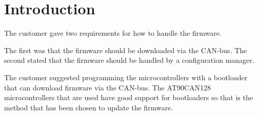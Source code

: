 \section{Introduction}\label{sec:introduction}
The customer gave two requirements for how to handle the firmware.

The first was that the firmware should be downloaded via the CAN-bus. The second stated that the firmware should be handled by a configuration manager.

The customer suggested programming the microcontrollers with a bootloader that can download firmware via the CAN-bus. The AT90CAN128 microcontrollers that are used have good support for bootloaders so that is the method that has been chosen to update the firmware.


